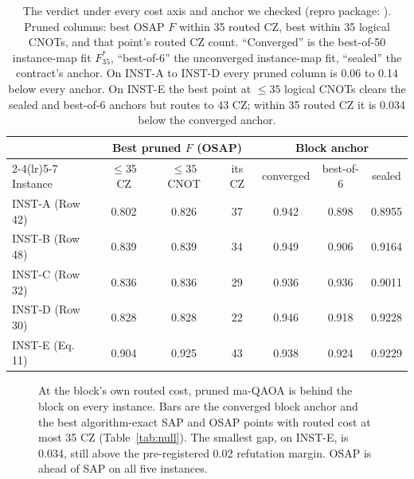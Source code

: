 \documentclass[11pt]{article}
\begin{document}
\begin{table}[t]
\centering
\small
\setlength{\tabcolsep}{4pt}
\begin{tabular}{lcccccc}
\toprule
 & \multicolumn{3}{c}{Best pruned $F$ (OSAP)} & \multicolumn{3}{c}{Block anchor} \\
\cmidrule(lr){2-4}\cmidrule(lr){5-7}
Instance & $\leq 35$ CZ & $\leq 35$ CNOT & its CZ & converged & best-of-6 & sealed \\
\midrule
INST-A (Row 42) & 0.802 & 0.826 & 37 & 0.942 & 0.898 & 0.8955 \\
INST-B (Row 48) & 0.839 & 0.839 & 34 & 0.949 & 0.906 & 0.9164 \\
INST-C (Row 32) & 0.836 & 0.836 & 29 & 0.936 & 0.936 & 0.9011 \\
INST-D (Row 30) & 0.828 & 0.828 & 22 & 0.946 & 0.918 & 0.9228 \\
INST-E (Eq. 11) & 0.904 & 0.925 & 43 & 0.938 & 0.924 & 0.9229 \\
\bottomrule
\end{tabular}
\caption[]{The verdict under every cost axis and anchor we checked (repro package: ). Pruned columns: best OSAP $F$ within 35 routed CZ, best within 35 logical CNOTs, and that point's routed CZ count. ``Converged'' is the best-of-50 instance-map fit $F_{35}^{*}$, ``best-of-6'' the unconverged instance-map fit, ``sealed'' the contract's anchor. On INST-A to INST-D every pruned column is 0.06 to 0.14 below every anchor. On INST-E the best point at $\leq 35$ logical CNOTs clears the sealed and best-of-6 anchors but routes to 43 CZ; within 35 routed CZ it is 0.034 below the converged anchor.}
\label{tab:matrix}
\end{table}

\begin{figure}[t]
\centering
{}
\caption{At the block's own routed cost, pruned ma-QAOA is behind the block on every instance. Bars are the converged block anchor and the best algorithm-exact SAP and OSAP points with routed cost at most 35 CZ (Table~\ref{tab:null}). The smallest gap, on INST-E, is 0.034, still above the pre-registered 0.02 refutation margin. OSAP is ahead of SAP on all five instances.}
\label{fig:null}
\end{figure}
\end{document}
